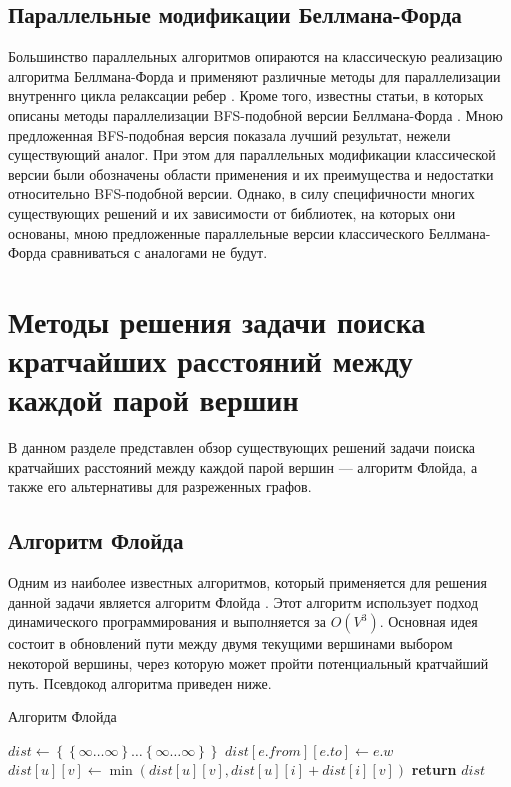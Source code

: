 \FloatBarrier
\subsection{Параллельные модификации Беллмана-Форда}

Большинство параллельных алгоритмов опираются на классическую реализацию алгоритма Беллмана-Форда и применяют различные методы для параллелизации внутреннго цикла релаксации ребер \cite{COHEN}\cite{GAURAV}. Кроме того, известны статьи, в которых описаны методы параллелизации BFS-подобной версии Беллмана-Форда \cite{LIGRA}. Мною предложенная BFS-подобная версия показала лучший результат, нежели существующий аналог. При этом для параллельных модификации классической версии были обозначены области применения и их преимущества и недостатки относительно BFS-подобной версии. Однако, в силу специфичности многих существующих решений и их зависимости от библиотек, на которых они основаны, мною предложенные параллельные версии классического Беллмана-Форда сравниваться с аналогами не будут. 


\FloatBarrier
\section{Методы решения задачи поиска кратчайших расстояний между каждой парой вершин}
В данном разделе представлен обзор существующих решений задачи поиска кратчайших расстояний между каждой парой вершин --- алгоритм Флойда, а также его альтернативы для разреженных графов.
\subsection{Алгоритм Флойда}
Одним из наиболее известных алгоритмов, который применяется для решения данной задачи является алгоритм Флойда \cite{CORMEN}. Этот алгоритм использует подход динамического программирования и выполняется за $O(V^3)$. Основная идея состоит в обновлений пути между двумя текущими вершинами выбором некоторой вершины, через которую может пройти потенциальный кратчайший путь. Псевдокод алгоритма приведен ниже. 

\FloatBarrier
\begin{algorithm}
\caption{Алгоритм Флойда}\label{floyd}
\begin{algorithmic}[1]
\State $dist\gets \left\{ {   \left\{ {\infty \ldots \infty}\right\}  \ldots \left\{ {\infty \ldots \infty}\right\} }\right\}$
	\State $dist[e.from][e.to] \gets e.w$
\EndFor 
\State
{}
			\State $dist[u][v] \gets \min(dist[u][v], dist[u][i] + dist[i][v])$
		\EndFor
	\EndFor
\EndFor
\State \textbf{return} $dist$
\EndProcedure
\end{algorithmic}
\end{algorithm}

